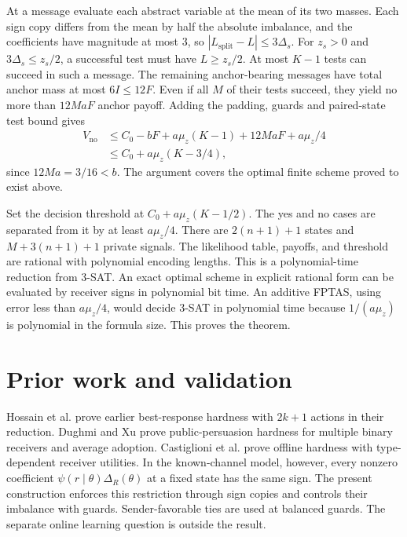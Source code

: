 \documentclass[11pt,a4paper]{amsart}
\begin{document}
At a message evaluate each abstract variable at the mean of its
two masses. Each sign copy differs from the mean by half the
absolute imbalance, and the coefficients have magnitude at most
3, so \(|L_{\mathrm{split}}-L|\leq3\Delta_s\).
For \(z_s>0\) and \(3\Delta_s\leq z_s/2\), a successful test must
have \(L\geq z_s/2\). At most \(K-1\) tests can succeed in such
a message. The remaining anchor-bearing messages have total
anchor mass at most \(6I\leq12F\). Even if all \(M\) of their tests
succeed, they yield no more than \(12MaF\) anchor payoff.
Adding the padding, guards and paired-state test bound gives
\[
 \begin{split}
 V_{\mathrm{no}}
 &\leq C_0-bF+a\mu_z(K-1)+12MaF+a\mu_z/4\\
 &\leq C_0+a\mu_z(K-3/4),
 \end{split}
\]
since \(12Ma=3/16<b\). The argument covers the optimal finite
scheme proved to exist above.

Set the decision threshold at \(C_0+a\mu_z(K-1/2)\).
The yes and no cases are separated from it by at least \(a\mu_z/4\).
There are \(2(n+1)+1\) states and \(M+3(n+1)+1\) private signals.
The likelihood table, payoffs, and threshold are rational with
polynomial encoding lengths. This is a polynomial-time reduction
from 3-SAT. An exact optimal scheme in explicit rational form can be
evaluated by receiver signs in polynomial bit time.
An additive FPTAS, using error less than \(a\mu_z/4\), would
decide 3-SAT in polynomial time because \(1/(a\mu_z)\) is polynomial
in the formula size. This proves the theorem.

\section{Prior work and validation}

Hossain et al. \cite[Thm.~3 and App.~A.3]{hossain} prove earlier
best-response hardness with \(2k+1\) actions in their reduction.
Dughmi and Xu \cite[Thm.~6.2]{dx} prove public-persuasion hardness for
multiple binary receivers and average adoption. Castiglioni et al.
\cite[Thm.~1]{cast} prove offline hardness with type-dependent
receiver utilities. In the known-channel model, however, every
nonzero coefficient \(\psi(r\mid\theta)\Delta_R(\theta)\) at
a fixed state has the same sign. The present construction enforces
this restriction through sign copies and controls their imbalance
with guards. Sender-favorable ties are used at balanced guards.
The separate online learning question is outside the result.
\end{document}

